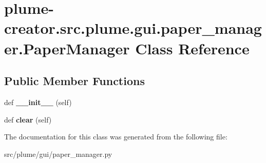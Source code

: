 \hypertarget{classplume-creator_1_1src_1_1plume_1_1gui_1_1paper__manager_1_1_paper_manager}{}\section{plume-\/creator.src.\+plume.\+gui.\+paper\+\_\+manager.\+Paper\+Manager Class Reference}
\label{classplume-creator_1_1src_1_1plume_1_1gui_1_1paper__manager_1_1_paper_manager}
\subsection*{Public Member Functions}
\begin{DoxyCompactItemize}
\item 
def {\bfseries \+\_\+\+\_\+init\+\_\+\+\_\+} (self)\hypertarget{classplume-creator_1_1src_1_1plume_1_1gui_1_1paper__manager_1_1_paper_manager_ae81c86ac0fba1207482ef47237911935}{}\label{classplume-creator_1_1src_1_1plume_1_1gui_1_1paper__manager_1_1_paper_manager_ae81c86ac0fba1207482ef47237911935}

\item 
def {\bfseries clear} (self)\hypertarget{classplume-creator_1_1src_1_1plume_1_1gui_1_1paper__manager_1_1_paper_manager_a877c5e954ac1f1ada4ec7278357196f3}{}\label{classplume-creator_1_1src_1_1plume_1_1gui_1_1paper__manager_1_1_paper_manager_a877c5e954ac1f1ada4ec7278357196f3}

\end{DoxyCompactItemize}


The documentation for this class was generated from the following file\+:\begin{DoxyCompactItemize}
\item 
src/plume/gui/paper\+\_\+manager.\+py\end{DoxyCompactItemize}
